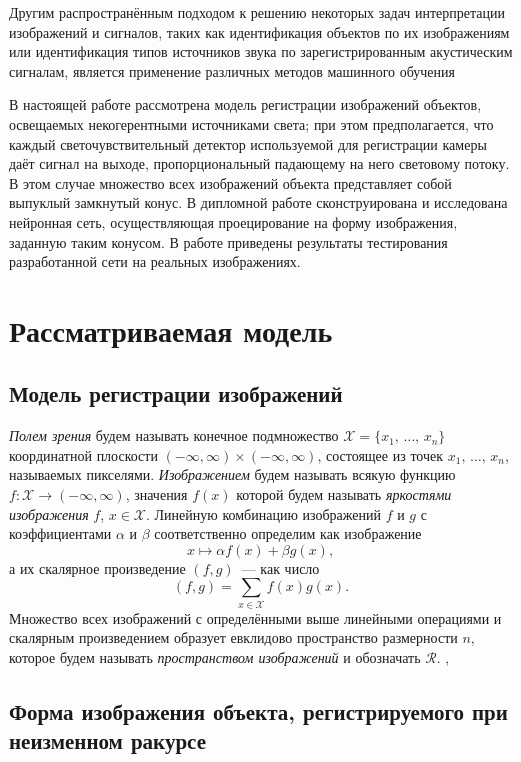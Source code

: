 \documentclass[a4paper, 12pt]{article}
\newcommand{\X}{{\mathcal X}}
\newcommand{\R}{{\mathcal R}}
\begin{document}
Другим распространённым подходом к решению некоторых задач интерпретации изображений и сигналов, таких как идентификация объектов по их изображениям или идентификация типов источников звука по зарегистрированным акустическим сигналам, является применение различных методов машинного обучения

В настоящей работе рассмотрена модель регистрации изображений объектов, освещаемых некогерентными источниками света; при этом предполагается, что каждый светочувствительный детектор используемой для регистрации камеры даёт сигнал на выходе, пропорциональный падающему на него световому потоку. В этом случае множество всех изображений объекта представляет собой выпуклый замкнутый конус. В дипломной работе сконструирована и исследована нейронная сеть, осуществляющая проецирование на форму изображения, заданную таким конусом. В работе приведены результаты тестирования разработанной сети на реальных изображениях.

\section{Рассматриваемая модель}
\subsection{Модель регистрации изображений}
\mbox{}\vspace{-\baselineskip}

\emph{Полем зрения} будем называть конечное подмножество $\X=\{x_1,\, \ldots,\, x_n\}$ координатной плоскости $(-\infty,\infty)\times(-\infty,\infty)$, состоящее из точек $x_1,\, \ldots,\, x_n$, называемых пикселями. \emph{Изображением} будем называть всякую функцию $f: \X\to(-\infty,\infty)$, значения $f(x)$ которой будем называть \emph{яркостями изображения} $f$, $x\in\X$. Линейную комбинацию изображений $f$ и $g$ с коэффициентами $\alpha$ и $\beta$ соответственно определим как изображение
$$
    x\mapsto \alpha f(x) + \beta g(x),
$$
а их скалярное произведение $(f,g)$~--- как число
$$
    (f,g) = \sum_{x\in\X} f(x)g(x).
$$
Множество всех изображений с определёнными выше линейными операциями и скалярным произведением образует евклидово пространство размерности $n$, которое будем называть \emph{пространством изображений} и обозначать $\R$. \cite{PitievChulichkov_morph_methods}, \cite{Pitiev_Zadachi_Morph_Analiza}

\subsection{Форма изображения объекта, регистрируемого при неизменном ракурсе}
\mbox{}\vspace{-\baselineskip}
\end{document}
